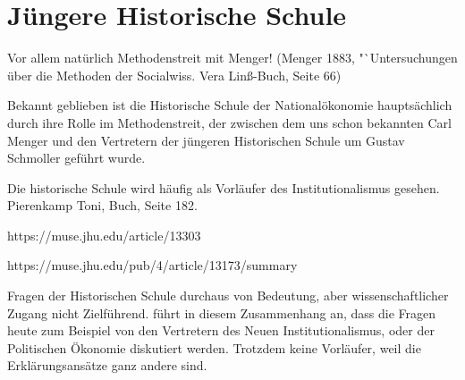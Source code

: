 \section{Jüngere Historische Schule}


Vor allem natürlich Methodenstreit mit Menger! (Menger 1883, "`Untersuchungen über die Methoden der Socialwiss. Vera Linß-Buch, Seite 66)

Bekannt geblieben ist die Historische Schule der Nationalökonomie hauptsächlich durch ihre Rolle im Methodenstreit, der zwischen dem uns schon bekannten Carl Menger und den Vertretern der jüngeren Historischen Schule um Gustav Schmoller geführt wurde.



Die historische Schule wird häufig als Vorläufer des Institutionalismus gesehen.
Pierenkamp Toni, Buch, Seite 182.


https://muse.jhu.edu/article/13303


https://muse.jhu.edu/pub/4/article/13173/summary




Fragen der Historischen Schule durchaus von Bedeutung, aber wissenschaftlicher Zugang nicht Zielführend. \textcite[S. 210]{Rosner2012} führt in diesem Zusammenhang an, dass die Fragen heute zum Beispiel von den Vertretern des Neuen Institutionalismus, oder der Politischen Ökonomie diskutiert werden. Trotzdem keine Vorläufer, weil die Erklärungsansätze ganz andere sind.


